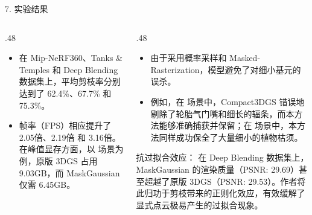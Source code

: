 \documentclass[aspectratio=169,10pt]{beamer}
\begin{document}
\begin{frame}[fragile,shrink=12]{7. 实验结果}
\footnotesize
\begin{columns}[T,onlytextwidth]
  \begin{column}{.48\textwidth}
    \begin{itemize}
    \item
      在 Mip-NeRF360、Tanks \& Temples 和 Deep Blending 数据集上，平均剪枝率分别达到了 \alert{62.4\%、67.7\% 和 75.3\%}。
    \item
      帧率（FPS）相应提升了 \alert{2.05倍、2.19倍 和 3.16倍}。在峰值显存方面，以  场景为例，原版 3DGS 占用 9.03GB，而 MaskGaussian 仅需 6.45GB。
    \end{itemize}
  \end{column}
  \begin{column}{.48\textwidth}
    \begin{itemize}
    \item
      由于采用概率采样和 Masked-Rasterization，模型避免了对细小基元的误杀。
    \item
      例如，在  场景中，Compact3DGS 错误地剔除了轮胎气门嘴和细长的辐条，而本方法能够准确捕获并保留；在  场景中，本方法同样成功保全了大量细小的植物枯须。
    \end{itemize}
    
    \alert{抗过拟合效应：} 在 Deep Blending 数据集上，MaskGaussian 的渲染质量（PSNR: 29.69）甚至超越了原版 3DGS（PSNR: 29.53）。作者将此归功于剪枝带来的正则化效应，有效缓解了显式点云极易产生的过拟合现象。
  \end{column}
\end{columns}
\end{frame}

\end{document}
